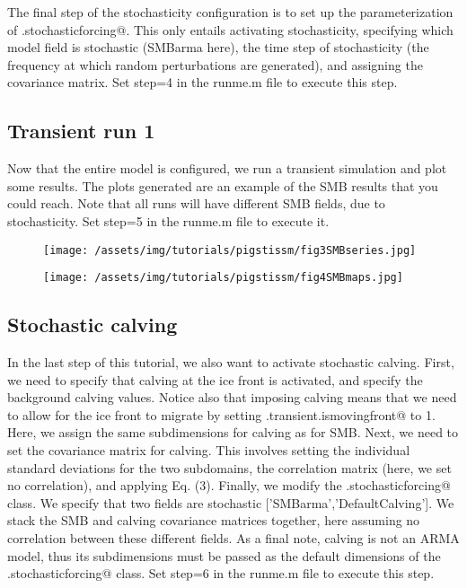 The final step of the stochasticity configuration is to set up the parameterization of \verb@md.stochasticforcing@. This only entails activating stochasticity, specifying which model field is stochastic (SMBarma here), the time step of stochasticity (the frequency at which random perturbations are generated), and assigning the covariance matrix.
Set step=4 in the runme.m file to execute this step.

\subsection{Transient run 1}%
Now that the entire model is configured, we run a transient simulation and plot some results. The plots generated are an example of the SMB results that you could reach. Note that all runs will have different SMB fields, due to stochasticity. Set step=5 in the runme.m file to execute it.
\begin{figure}
	\begin{center}
		\texttt{[image: /assets/img/tutorials/pigstissm/fig3SMBseries.jpg]}
	\end{center}
\end{figure}
\begin{figure}
	\begin{center}
		\texttt{[image: /assets/img/tutorials/pigstissm/fig4SMBmaps.jpg]}
	\end{center}
\end{figure}

\subsection{Stochastic calving}%
In the last step of this tutorial, we also want to activate stochastic calving. First, we need to specify that calving at the ice front is activated, and specify the background calving values. Notice also that imposing calving means that we need to allow for the ice front to migrate by setting \verb@md.transient.ismovingfront@ to 1.
Here, we assign the same subdimensions for calving as for SMB. Next, we need to set the covariance matrix for calving. This involves setting the individual standard deviations for the two subdomains, the correlation matrix (here, we set no correlation), and applying Eq. (3). Finally, we modify the \verb@md.stochasticforcing@ class. We specify that two fields are stochastic [{'SMBarma'},{'DefaultCalving'}]. We stack the SMB and calving covariance matrices together, here assuming no correlation between these different fields. As a final note, calving is not an ARMA model, thus its subdimensions must be passed as the default dimensions of the \verb@md.stochasticforcing@ class.
Set step=6 in the runme.m file to execute this step.

